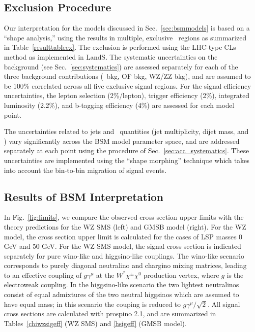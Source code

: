 \subsection{Exclusion Procedure}

Our interpretation for the models discussed in Sec.~\ref{sec:bsmmodels} is based on a ``shape analysis,'' using the results in multiple, exclusive
\MET\ regions as summarized in Table~\ref{resulttableex}. 
The exclusion is performed using the LHC-type CLs method as implemented in LandS.
The systematic uncertainties on the background (see Sec.~\ref{sec:systematics}) are assessed separately for each of the
three background contributions (\zjets\ bkg, OF bkg, WZ/ZZ bkg), and are assumed to be 100\% correlated across all five
exclusive signal regions. For the signal efficiency uncertainties, the lepton selection (2\%/lepton), trigger efficiency (2\%),
integrated luminosity (2.2\%), and b-tagging efficiency (4\%) are assessed for each model point. 

The uncertainties related to jets and \MET\ quantities (jet multiplicity, dijet mass, and \MET) vary significantly across 
the BSM model parameter space, and are addressed separately at each point using the procedure of Sec.~\ref{sec:acc_systematics}.
These uncertainties are implemented using the ``shape morphing'' technique which takes into account the bin-to-bin migration
of signal events.

\subsection{Results of BSM Interpretation}
\label{sec:bsmresults}

In Fig.~\ref{fig:limits}, we compare the observed cross section upper limits with the theory predictions
for the WZ SMS (left) %
and GMSB model (right).
For the WZ %
model, the cross section upper limit is calculated for the cases of LSP masses 0 GeV and 50 GeV.
For the WZ SMS model, the signal cross section is indicated separately for pure wino-like and higgsino-like couplings. 
The wino-like scenario corresponds to purely diagonal neutralino and chargino mixing matrices, leading to an effective coupling
of $g\gamma^{\mu}$ at the $W^*\chi^{\pm}\chi^{0}$ production vertex, where $g$ is the electroweak coupling.
In the higgsino-like scenario the two lightest neutralinos consist of equal admixtures of the two neutral higgsinos which are
assumed to have equal mass; in this scenario the couping is reduced to $g\gamma^{\mu}/\sqrt{2}$.
All signal cross sections are calculated with {\sc prospino} 2.1, and are summarized in Tables~\ref{chiwzsigeff} (WZ SMS)
and \ref{hsigeff} (GMSB model).

